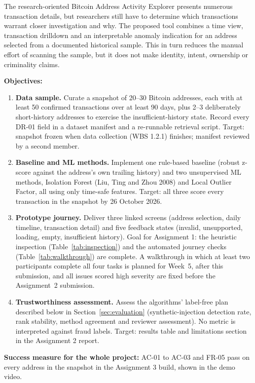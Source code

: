 The research-oriented Bitcoin Address Activity Explorer presents numerous transaction details, but researchers still have to determine which transactions warrant closer investigation and why. The proposed tool combines a time view, transaction drilldown and an interpretable anomaly indication for an address selected from a documented historical sample. This in turn reduces the manual effort of scanning the sample, but it does not make identity, intent, ownership or criminality claims.

\textbf{Objectives:}

\begin{enumerate}
  \item \textbf{Data sample.} Curate a snapshot of 20–30 Bitcoin addresses, each with at least 50 confirmed transactions over at least 90 days, plus 2–3 deliberately short-history addresses to exercise the insufficient-history state. Record every DR-01 field in a dataset manifest and a re-runnable retrieval script. Target: snapshot frozen when data collection (WBS 1.2.1) finishes; manifest reviewed by a second member.
  \item \textbf{Baseline and ML methods.} Implement one rule-based baseline (robust z-score against the address's own trailing history) and two unsupervised ML methods, Isolation Forest (Liu, Ting and Zhou 2008) and Local Outlier Factor, all using only time-safe features. Target: all three score every transaction in the snapshot by 26 October 2026.
  \item \textbf{Prototype journey.} Deliver three linked screens (address selection, daily timeline, transaction detail) and five feedback states (invalid, unsupported, loading, empty, insufficient history). Goal for Assignment 1: the heuristic inspection (Table~\ref{tab:inspection}) and the automated journey checks (Table~\ref{tab:walkthrough}) are complete. A walkthrough in which at least two participants complete all four tasks is planned for Week~5, after this submission, and all issues scored high severity are fixed before the Assignment~2 submission.
  \item \textbf{Trustworthiness assessment.} Assess the algorithms' label-free plan described below in Section~\ref{sec:evaluation} (synthetic-injection detection rate, rank stability, method agreement and reviewer assessment). No metric is interpreted against fraud labels. Target: results table and limitations section in the Assignment 2 report.
\end{enumerate}

\textbf{Success measure for the whole project:} AC-01 to AC-03 and FR-05 pass on every address in the snapshot in the Assignment 3 build, shown in the demo video.

